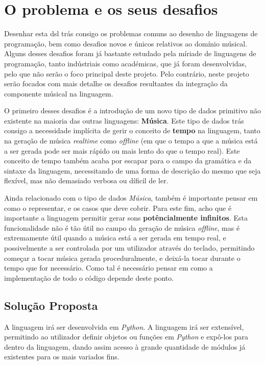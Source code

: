 \chapter{O problema e os seus desafios}
Desenhar esta \acrfull{dsl} trás consigo os problemas comuns ao desenho de linguagens de programação, bem como desafios novos e únicos relativos ao domínio músical. Alguns desses desafios foram já bastante estudado pela míriade de linguagens de programação, tanto indústriais como académicas, que já foram desenvolvidas, pelo que não serão o foco principal deste projeto. Pelo contrário, neste projeto serão focados com mais detalhe os desafios resultantes da integração da componente músical na linguagem.


O primeiro desses desafios é a introdução de um novo tipo de dados primitivo não existente na maioria das outras linguagens: \textbf{Música}. Este tipo de dados trás consigo a necessidade implícita de gerir o conceito de \textbf{tempo} na linguagem, tanto na geração de música \textit{realtime} como \textit{offline} (em que o tempo a que a música está a ser gerada pode ser mais rápido ou mais lento do que o tempo real). Este conceito de tempo também acaba por escapar para o campo da gramática e da sintaxe da linguagem, necessitando de uma forma de descrição do mesmo que seja flexível, mas não demasiado verbosa ou díficil de ler.

Ainda relacionado com o tipo de dados \textit{Música}, também é importante pensar em como o representar, e os casos que deve cobrir. Para este fim, acho que é importante a linguagem permitir gerar sons \textbf{potêncialmente infinitos}. Esta funcionalidade não é tão útil no campo da geração de música \textit{offline}, mas é extremamente útil quando a música está a ser gerada em tempo real, e possivelmente a ser controlada por um utilizador através do teclado, permitindo começar a tocar música gerada proceduralmente, e deixá-la tocar durante o tempo que for necessário. Como tal é necessário pensar em como a implementação de todo o código depende deste ponto.

\section{Solução Proposta}
A linguagem irá ser desenvolvida em \textit{Python}. A linguagem irá ser extensível, permitindo ao utilizador definir objetos ou funções em \textit{Python} e expô-los para dentro da linguagem, dando assim acesso à grande quantidade de módulos já existentes para os mais variados fins.

